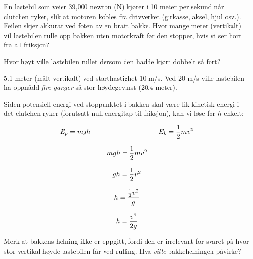 
En lastebil som veier 39,000 newton (N) kjører i 10 meter per sekund når clutchen ryker, slik at motoren kobles fra drivverket (girkasse, aksel, hjul osv.). Feilen skjer akkurat ved foten av en bratt bakke. Hvor mange meter (vertikalt) vil lastebilen rulle opp bakken uten motorkraft før den stopper, hvis vi ser bort fra all friksjon?

\vskip 10pt

Hvor høyt ville lastebilen rullet dersom den hadde kjørt dobbelt så fort?







5.1 meter (målt vertikalt) ved starthastighet 10 m/s. Ved 20 m/s ville lastebilen ha oppnådd {\it fire ganger} så stor høydegevinst (20.4 meter).

\vskip 10pt

Siden potensiell energi ved stoppunktet i bakken skal være lik kinetisk energi i det clutchen ryker (forutsatt null energitap til friksjon), kan vi løse for $h$ enkelt:

$$E_p = mgh \hbox{\hskip 100pt} E_k = {1 \over 2}mv^2$$

$$mgh = {1 \over 2}mv^2$$

$$gh = {1 \over 2}v^2$$

$$h = {{1 \over 2}v^2 \over g}$$

$$h = {v^2 \over 2g}$$

Merk at bakkens helning ikke er oppgitt, fordi den er irrelevant for svaret på hvor stor vertikal høyde lastebilen får ved rulling. Hva {\it ville} bakkehelningen påvirke?









